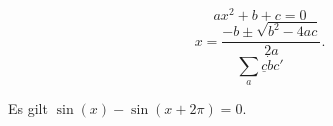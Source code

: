 \documentclass{article}
\begin{document}
\[
  ax^2+b+c=0
\]
\[
  x = \frac{-b \pm \sqrt{b^2-4ac}}{2a}.
\]
\[
  \sum_a\underline c\dot bc'
\]

Es gilt $\sin(x)-\sin(x+2\pi)=0$.
\end{document}
